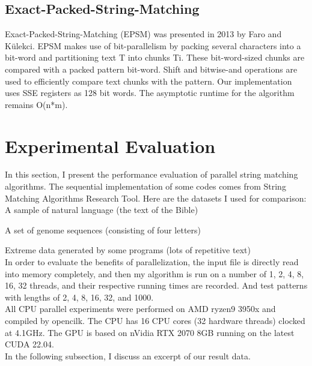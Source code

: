 \documentclass[11pt]{article}       %
\newcommand{\includeFig}[3]      {\begin{figure}[htb] \begin{center}
                                 \includegraphics
                                 [width=4in,keepaspectratio] %
                                 {#2}\caption{\label{#1}#3} \end{center} \end{figure}}
\begin{document}
\subsection{Exact-Packed-String-Matching}\label{EPSM}
Exact-Packed-String-Matching (EPSM) was presented in 2013 by Faro and Külekci. EPSM makes use of bit-parallelism by packing several characters into a bit-word and partitioning text T into chunks Ti. These bit-word-sized chunks are compared with a packed pattern bit-word. Shift and bitwise-and operations are used to efficiently compare text chunks with the pattern. Our implementation uses SSE registers as 128 bit words. The asymptotic runtime for the algorithm remains O(n*m).


\section{Experimental Evaluation} \label{expEval}

In this section, I present the performance evaluation of parallel string matching algorithms. The sequential implementation of some codes comes from String Matching Algorithms Research Tool.
Here are the datasets I used for comparison:\\

A sample of natural language (the text of the Bible)

A set of genome sequences (consisting of four letters)

Extreme data generated by some programs (lots of repetitive text)\\

In order to evaluate the benefits of parallelization, the input file is directly read into memory completely, and then my algorithm is run on a number of 1, 2, 4, 8, 16, 32 threads, and their respective running times are recorded. And test patterns with lengths of 2, 4, 8, 16, 32, and 1000.\\
All CPU parallel experiments were performed on AMD ryzen9 3950x and compiled by opencilk. The CPU has 16 CPU cores (32 hardware threads) clocked at 4.1GHz. The GPU is based on nVidia RTX 2070 8GB running on the latest CUDA 22.04.\\
In the following subsection, I discuss an excerpt of our result data.
\end{document}
